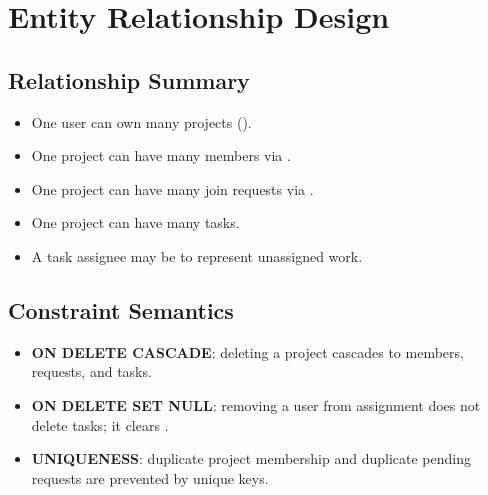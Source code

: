 \section{Entity Relationship Design}



\subsection{Relationship Summary}

\begin{itemize}
    \item One user can own many projects ().
    \item One project can have many members via .
    \item One project can have many join requests via .
    \item One project can have many tasks.
    \item A task assignee may be  to represent unassigned work.
\end{itemize}

\subsection{Constraint Semantics}

\begin{itemize}
    \item \textbf{ON DELETE CASCADE}: deleting a project cascades to members, requests, and tasks.
    \item \textbf{ON DELETE SET NULL}: removing a user from assignment does not delete tasks; it clears .
    \item \textbf{UNIQUENESS}: duplicate project membership and duplicate pending requests are prevented by unique keys.
\end{itemize}
